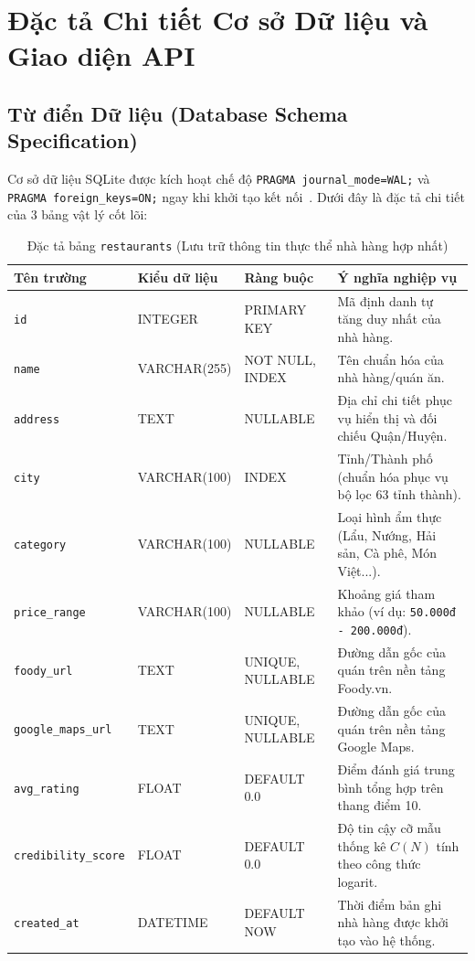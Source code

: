 \documentclass[12pt, a4paper]{article}
\begin{document}
\newpage
\section{Đặc tả Chi tiết Cơ sở Dữ liệu và Giao diện API}

\subsection{Từ điển Dữ liệu (Database Schema Specification)}
Cơ sở dữ liệu SQLite được kích hoạt chế độ \texttt{PRAGMA journal\_mode=WAL;} và \texttt{PRAGMA foreign\_keys=ON;} ngay khi khởi tạo kết nối~\cite{hipp2024}. Dưới đây là đặc tả chi tiết của 3 bảng vật lý cốt lõi:

\begin{table}[H]
\centering
\caption{Đặc tả bảng \texttt{restaurants} (Lưu trữ thông tin thực thể nhà hàng hợp nhất)}
\label{tab:schema_restaurants}
\vspace{0.15cm}
\footnotesize
\begin{tabularx}{\textwidth}{l l l X}
\toprule
\rowcolor{blue!8}
\textbf{Tên trường} & \textbf{Kiểu dữ liệu} & \textbf{Ràng buộc} & \textbf{Ý nghĩa nghiệp vụ} \\
\midrule
\texttt{id} & INTEGER & PRIMARY KEY & Mã định danh tự tăng duy nhất của nhà hàng. \\
\texttt{name} & VARCHAR(255) & NOT NULL, INDEX & Tên chuẩn hóa của nhà hàng/quán ăn. \\
\texttt{address} & TEXT & NULLABLE & Địa chỉ chi tiết phục vụ hiển thị và đối chiếu Quận/Huyện. \\
\texttt{city} & VARCHAR(100) & INDEX & Tỉnh/Thành phố (chuẩn hóa phục vụ bộ lọc 63 tỉnh thành). \\
\texttt{category} & VARCHAR(100) & NULLABLE & Loại hình ẩm thực (Lẩu, Nướng, Hải sản, Cà phê, Món Việt...). \\
\texttt{price\_range} & VARCHAR(100) & NULLABLE & Khoảng giá tham khảo (ví dụ: \texttt{50.000đ - 200.000đ}). \\
\texttt{foody\_url} & TEXT & UNIQUE, NULLABLE & Đường dẫn gốc của quán trên nền tảng Foody.vn. \\
\texttt{google\_maps\_url} & TEXT & UNIQUE, NULLABLE & Đường dẫn gốc của quán trên nền tảng Google Maps. \\
\texttt{avg\_rating} & FLOAT & DEFAULT 0.0 & Điểm đánh giá trung bình tổng hợp trên thang điểm 10. \\
\texttt{credibility\_score} & FLOAT & DEFAULT 0.0 & Độ tin cậy cỡ mẫu thống kê $C(N)$ tính theo công thức logarit. \\
\texttt{created\_at} & DATETIME & DEFAULT NOW & Thời điểm bản ghi nhà hàng được khởi tạo vào hệ thống. \\
\bottomrule
\end{tabularx}
\end{table}
\end{document}
